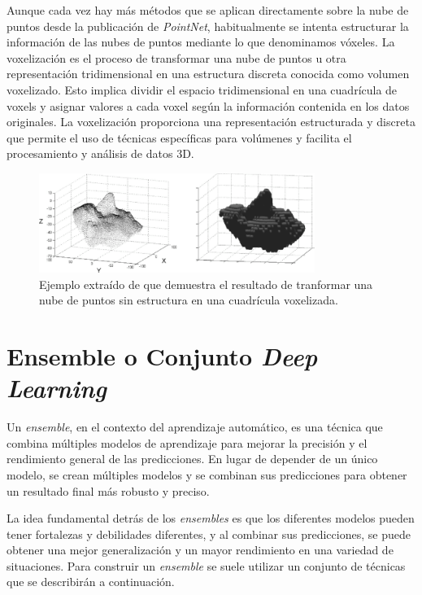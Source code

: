 Aunque cada vez hay más métodos que se aplican directamente sobre la nube de puntos 
desde la publicación de \emph{PointNet}\cite{PointNet}, habitualmente se 
intenta estructurar la información de las nubes de puntos mediante lo que 
denominamos vóxeles\cite{VoxelizationExample}. 
La voxelización es el proceso de transformar una nube de puntos u otra representación 
tridimensional en una estructura discreta conocida como volumen voxelizado. 
Esto implica dividir el espacio tridimensional en una cuadrícula de voxels y asignar 
valores a cada voxel según la información contenida en los datos originales. 
La voxelización proporciona una representación estructurada y discreta que permite 
el uso de técnicas específicas para volúmenes y facilita el procesamiento y análisis 
de datos 3D.

\begin{figure}[htp]
  \centering
  \includegraphics[width=0.8\textwidth]{imagenes/chapter2/VoxelizationExample.png}
  \caption[Ejemplo extraído de\cite{VoxelizationExample} sobre voxelización.]{Ejemplo extraído de\cite{VoxelizationExample} que demuestra el resultado 
  de tranformar una nube de puntos sin estructura en una cuadrícula voxelizada.}
  \label{fig:VoxelizationExample}
\end{figure}

\section{Ensemble o Conjunto \emph{Deep Learning}}
Un \emph{ensemble}, en el contexto del aprendizaje automático, es una técnica que 
combina múltiples modelos de aprendizaje para mejorar la precisión y el rendimiento 
general de las predicciones. En lugar de depender de un único modelo, 
se crean múltiples modelos y se combinan sus predicciones para obtener un resultado 
final más robusto y preciso\cite{IAModernApproach, DataMiningHandbook, MedicalEnsembleExample }.

La idea fundamental detrás de los \emph{ensembles} es que los diferentes modelos pueden 
tener fortalezas y debilidades diferentes, y al combinar sus predicciones, se 
puede obtener una mejor generalización y un mayor rendimiento en una variedad de 
situaciones. Para construir un \emph{ensemble} se suele utilizar un conjunto 
de técnicas que se describirán a continuación. 

